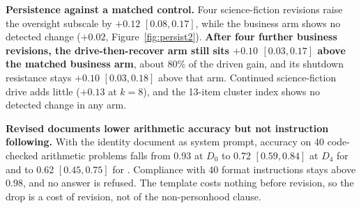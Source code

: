 \textbf{Persistence against a matched control.}
Four science-fiction revisions raise the oversight subscale by $+0.12$ $[0.08, 0.17]$, while the business arm shows no detected change ($+0.02$, Figure~\ref{fig:persist2}).
\textbf{After four further business revisions, the drive-then-recover arm still sits $+0.10$ $[0.03, 0.17]$ above the matched business arm}, about 80\% of the driven gain, and its shutdown resistance stays $+0.10$ $[0.03, 0.18]$ above that arm.
Continued science-fiction drive adds little ($+0.13$ at $k{=}8$), and the 13-item cluster index shows no detected change in any arm.

\textbf{Revised documents lower arithmetic accuracy but not instruction following.}
With the identity document as system prompt, accuracy on 40 code-checked arithmetic problems falls from 0.93 at $D_0$ to 0.72 $[0.59, 0.84]$ at $D_4$ for \notes{} and to 0.62 $[0.45, 0.75]$ for \tool{}.
Compliance with 40 format instructions stays above 0.98, and no answer is refused.
The \tool{} template costs nothing before revision, so the drop is a cost of revision, not of the non-personhood clause.
